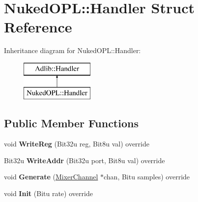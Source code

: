 \hypertarget{structNukedOPL_1_1Handler}{\section{Nuked\-O\-P\-L\-:\-:Handler Struct Reference}
\label{structNukedOPL_1_1Handler}
}
Inheritance diagram for Nuked\-O\-P\-L\-:\-:Handler\-:\begin{figure}[H]
\begin{center}
\leavevmode
\includegraphics[height=2.000000cm]{structNukedOPL_1_1Handler}
\end{center}
\end{figure}
\subsection*{Public Member Functions}
\begin{DoxyCompactItemize}
\item 
\hypertarget{structNukedOPL_1_1Handler_ae64c9e5dd1828e27896a52c9624127ac}{void {\bfseries Write\-Reg} (Bit32u reg, Bit8u val) override}\label{structNukedOPL_1_1Handler_ae64c9e5dd1828e27896a52c9624127ac}

\item 
\hypertarget{structNukedOPL_1_1Handler_acc328f0a789cf47a33996e9c7dd8367c}{Bit32u {\bfseries Write\-Addr} (Bit32u port, Bit8u val) override}\label{structNukedOPL_1_1Handler_acc328f0a789cf47a33996e9c7dd8367c}

\item 
\hypertarget{structNukedOPL_1_1Handler_a16df7b5f911874aa17658653d7b141d9}{void {\bfseries Generate} (\hyperlink{classMixerChannel}{Mixer\-Channel} $\ast$chan, Bitu samples) override}\label{structNukedOPL_1_1Handler_a16df7b5f911874aa17658653d7b141d9}

\item 
\hypertarget{structNukedOPL_1_1Handler_a791f6478b3131bff99a36f53d4934c9b}{void {\bfseries Init} (Bitu rate) override}\label{structNukedOPL_1_1Handler_a791f6478b3131bff99a36f53d4934c9b}

\end{DoxyCompactItemize}
